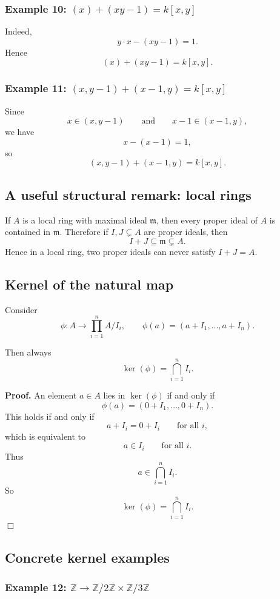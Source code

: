 \documentclass[12pt,a4paper]{article}
\theoremstyle{notespace}
\begin{document}
\subsubsection*{Example 10: \((x)+(xy-1)=k[x,y]\)}

Indeed,
\[
y\cdot x-(xy-1)=1.
\]
Hence
\[
(x)+(xy-1)=k[x,y].
\]

\subsubsection*{Example 11: \((x,y-1)+(x-1,y)=k[x,y]\)}

Since
\[
x\in (x,y-1)
\qquad\text{and}\qquad
x-1\in (x-1,y),
\]
we have
\[
x-(x-1)=1,
\]
so
\[
(x,y-1)+(x-1,y)=k[x,y].
\]

\subsection{A useful structural remark: local rings}

If \(A\) is a local ring with maximal ideal \(\mathfrak m\), then every proper ideal of \(A\) is contained in \(\mathfrak m\). Therefore if \(I,J\subsetneq A\) are proper ideals, then
\[
I+J\subseteq \mathfrak m\subsetneq A.
\]
Hence in a local ring, two proper ideals can never satisfy \(I+J=A\).

\subsection{Kernel of the natural map}

Consider
\[
\phi:A\to \prod_{i=1}^n A/I_i,
\qquad
\phi(a)=(a+I_1,\dots,a+I_n).
\]

Then always
\[
\ker(\phi)=\bigcap_{i=1}^n I_i.
\]

\textbf{Proof.}
An element \(a\in A\) lies in \(\ker(\phi)\) if and only if
\[
\phi(a)=(0+I_1,\dots,0+I_n).
\]
This holds if and only if
\[
a+I_i=0+I_i
\qquad\text{for all }i,
\]
which is equivalent to
\[
a\in I_i
\qquad\text{for all }i.
\]
Thus
\[
a\in \bigcap_{i=1}^n I_i.
\]
So
\[
\ker(\phi)=\bigcap_{i=1}^n I_i.
\]
\hfill\(\Box\)

\subsection{Concrete kernel examples}

\subsubsection*{Example 12: \(\mathbb Z\to \mathbb Z/2\mathbb Z\times \mathbb Z/3\mathbb Z\)}
\end{document}
